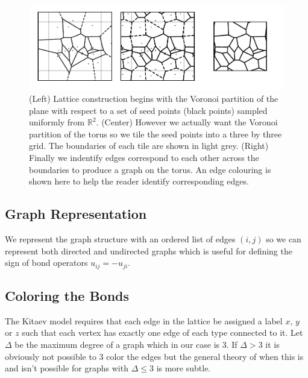 \begin{figure}
\hypertarget{fig:lattice_construction_animated}{%
\centering
\includegraphics{figure_code/amk_chapter/lattice_construction_animated/lattice_construction_animated.pdf}
\caption{(Left) Lattice construction begins with the Voronoi partition
of the plane with respect to a set of seed points (black points) sampled
uniformly from \(\mathbb{R}^2\). (Center) However we actually want the
Voronoi partition of the torus so we tile the seed points into a three
by three grid. The boundaries of each tile are shown in light grey.
(Right) Finally we indentify edges correspond to each other across the
boundaries to produce a graph on the torus. An edge colouring is shown
here to help the reader identify corresponding
edges.}\label{fig:lattice_construction_animated}
}
\end{figure}

\hypertarget{graph-representation}{%
\subsection{Graph Representation}\label{graph-representation}}

We represent the graph structure with an ordered list of edges \((i,j)\)
so we can represent both directed and undirected graphs which is useful
for defining the sign of bond operators \(u_{ij} = - u_{ji}\).

\hypertarget{coloring-the-bonds}{%
\subsection{Coloring the Bonds}\label{coloring-the-bonds}}

The Kitaev model requires that each edge in the lattice be assigned a
label \(x\), \(y\) or \(z\) such that each vertex has exactly one edge
of each type connected to it. Let \(\Delta\) be the maximum degree of a
graph which in our case is 3. If \(\Delta > 3\) it is obviously not
possible to 3 color the edges but the general theory of when this is and
isn't possible for graphs with \(\Delta \leq 3\) is more subtle.

